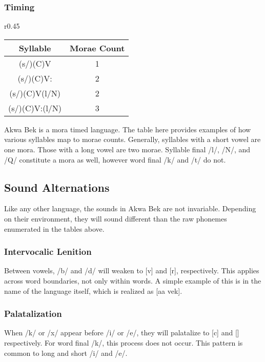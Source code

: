 \documentclass[11pt,letterpaper]{article}
\newcommand{\tx}{\textipa{S}}
\newcommand{\tkw}{\textipa{k\super w}}
\newcommand{\cs}{\textipa{\c{c}}}
\begin{document}
    \subsubsection{Timing}
    \label{timing}
    \begin{wrapfigure}{r}{0.45\textwidth}
      \begin{tabular}{|c|c|}
      \hline
      Syllable          & Morae Count \\ \hline \hline
      (s/\tx)(C)V       & 1           \\
      (s/\tx)(C)V:      & 2           \\
      (s/\tx)(C)V(l/N)  & 2           \\
      (s/\tx)(C)V:(l/N) & 3           \\ \hline
      \end{tabular}
    \end{wrapfigure}
    Akwa Bek is a mora timed language. The table here provides examples of how various syllables map to morae counts. Generally, syllables with a short vowel are one mora. Those with a long vowel are two morae. Syllable final /l/, /N/, and /Q/ constitute a mora as well, however word final /k/ and /t/ do not. 

  \subsection{Sound Alternations}
  \label{soundalternations}
  Like any other language, the sounds in Akwa Bek are not invariable. Depending on their environment, they will sound different than the raw phonemes enumerated in the tables above.

    \subsubsection{Intervocalic Lenition}
    \label{lenition}
    Between vowels, /b/ and /d/ will weaken to [v] and [r], respectively. This applies across word boundaries, not only within words. A simple example of this is in the name of the language itself, which is realized as [a\tkw a vek].

    \subsubsection{Palatalization}
    \label{palatalization}
    When /k/ or /x/ appear before /i/ or /e/, they will palatalize to [c] and [\cs] respectively. For word final /k/, this process does not occur. This pattern is common to long and short /i/ and /e/.
\end{document}
